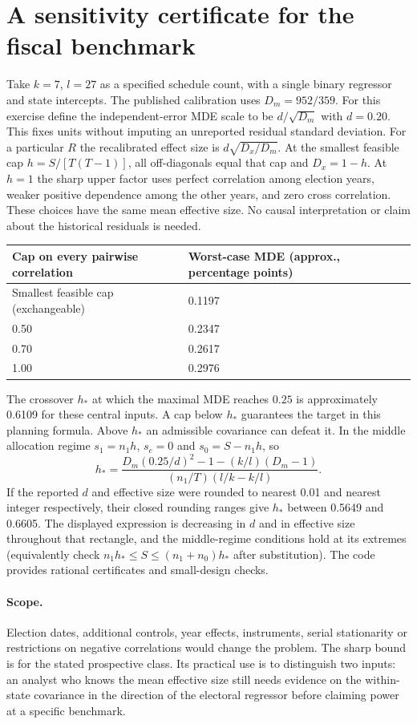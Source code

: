 \documentclass[11pt]{article}
\begin{document}
\section{A sensitivity certificate for the fiscal benchmark}
Take $k=7$, $l=27$ as a specified schedule count, with a single binary regressor and state intercepts. The published calibration uses $D_m=952/359$. For this exercise define the independent-error MDE scale to be $d/\sqrt{D_m}$ with $d=0.20$. This fixes units without imputing an unreported residual standard deviation. For a particular $R$ the recalibrated effect size is $d\sqrt{D_x/D_m}$. At the smallest feasible cap $h=S/[T(T-1)]$, all off-diagonals equal that cap and $D_x=1-h$. At $h=1$ the sharp upper factor uses perfect correlation among election years, weaker positive dependence among the other years, and zero cross correlation. These choices have the same mean effective size. No causal interpretation or claim about the historical residuals is needed.

\begin{center}\begin{tabular}{ll}\toprule
Cap on every pairwise correlation & Worst-case MDE (approx., percentage points)\\\midrule
Smallest feasible cap (exchangeable) & 0.1197\\
0.50 & 0.2347\\
0.70 & 0.2617\\
1.00 & 0.2976\\\bottomrule
\end{tabular}\end{center}

The crossover $h_*$ at which the maximal MDE reaches $0.25$ is approximately 0.6109 for these central inputs. A cap below $h_*$ guarantees the target in this planning formula. Above $h_*$ an admissible covariance can defeat it. In the middle allocation regime $s_1=n_1h$, $s_c=0$ and $s_0=S-n_1h$, so
\[
 h_*=\frac{D_m(0.25/d)^2-1-(k/l)(D_m-1)}
                 {(n_1/T)(l/k-k/l)} .
\]
If the reported $d$ and effective size were rounded to nearest 0.01 and nearest integer respectively, their closed rounding ranges give $h_*$ between 0.5649 and 0.6605. The displayed expression is decreasing in $d$ and in effective size throughout that rectangle, and the middle-regime conditions hold at its extremes (equivalently check $n_1h_*\le S\le(n_1+n_0)h_*$ after substitution). The code provides rational certificates and small-design checks.

\paragraph{Scope.} Election dates, additional controls, year effects, instruments, serial stationarity or restrictions on negative correlations would change the problem. The sharp bound is for the stated prospective class. Its practical use is to distinguish two inputs: an analyst who knows the mean effective size still needs evidence on the within-state covariance in the direction of the electoral regressor before claiming power at a specific benchmark.
\end{document}
